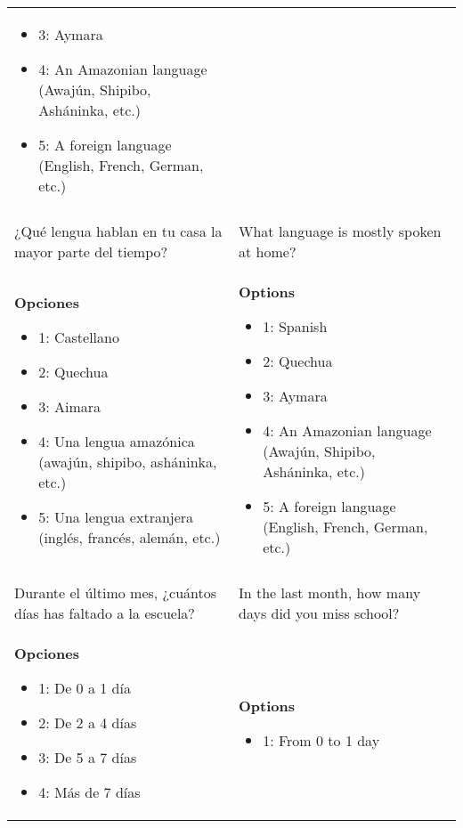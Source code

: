\documentclass[11pt]{article}
\begin{document}
\begin{longtable}{@{}LL@{}}
\begin{itemize}[leftmargin=*]
\item 3: Aymara
\item 4: An Amazonian language (Awajún, Shipibo, Asháninka, etc.)
\item 5: A foreign language (English, French, German, etc.)\end{itemize} \\
\addlinespace[4pt]
 \\ 
¿Qué lengua hablan en tu casa la mayor parte del tiempo? & What language is mostly spoken at home? \\
\textbf{Opciones}\par\begin{itemize}[leftmargin=*]\item 1: Castellano
\item 2: Quechua
\item 3: Aimara
\item 4: Una lengua amazónica (awajún, shipibo, asháninka, etc.)
\item 5: Una lengua extranjera (inglés, francés, alemán, etc.)\end{itemize} & \textbf{Options}\par\begin{itemize}[leftmargin=*]\item 1: Spanish
\item 2: Quechua
\item 3: Aymara
\item 4: An Amazonian language (Awajún, Shipibo, Asháninka, etc.)
\item 5: A foreign language (English, French, German, etc.)\end{itemize} \\
\addlinespace[4pt]
 \\ 
Durante el último mes, ¿cuántos días has faltado a la escuela? & In the last month, how many days did you miss school? \\
\textbf{Opciones}\par\begin{itemize}[leftmargin=*]\item 1: De 0 a 1 día
\item 2: De 2 a 4 días
\item 3: De 5 a 7 días
\item 4: Más de 7 días\end{itemize} & \textbf{Options}\par\begin{itemize}[leftmargin=*]\item 1: From 0 to 1 day

\end{itemize}
\end{longtable}
\end{document}
